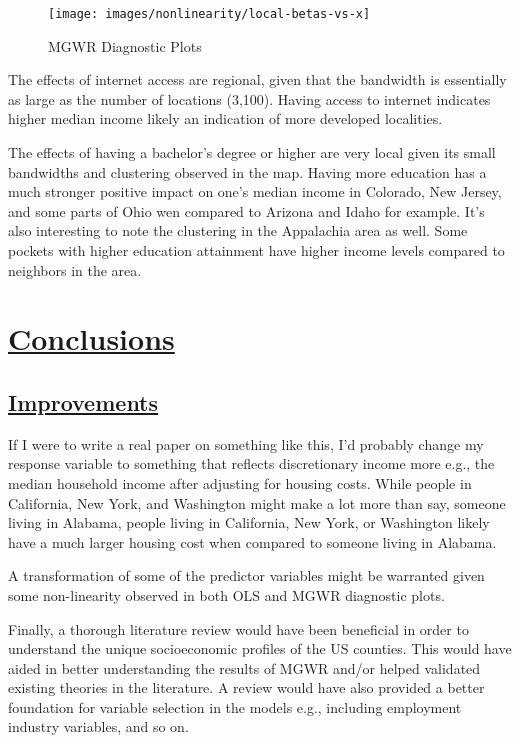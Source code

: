 \documentclass[
]{article}
\begin{document}
\begin{figure}[H]

{\centering \texttt{[image: images/nonlinearity/local-betas-vs-x]} 

}

\caption{MGWR Diagnostic Plots}\label{fig:unnamed-chunk-8}
\end{figure}

\newpage

The effects of internet access are regional, given that the bandwidth is
essentially as large as the number of locations (3,100). Having access
to internet indicates higher median income likely an indication of more
developed localities.

The effects of having a bachelor's degree or higher are very local given
its small bandwidths and clustering observed in the map. Having more
education has a much stronger positive impact on one's median income in
Colorado, New Jersey, and some parts of Ohio wen compared to Arizona and
Idaho for example. It's also interesting to note the clustering in the
Appalachia area as well. Some pockets with higher education attainment
have higher income levels compared to neighbors in the area.

\newpage

\section{\texorpdfstring{\ul{Conclusions}}{Conclusions}}\label{conclusions}

\subsection{\texorpdfstring{\ul{Improvements}}{Improvements}}\label{improvements}

If I were to write a real paper on something like this, I'd probably
change my response variable to something that reflects discretionary
income more e.g., the median household income after adjusting for
housing costs. While people in California, New York, and Washington
might make a lot more than say, someone living in Alabama, people living
in California, New York, or Washington likely have a much larger housing
cost when compared to someone living in Alabama.

A transformation of some of the predictor variables might be warranted
given some non-linearity observed in both OLS and MGWR diagnostic plots.

Finally, a thorough literature review would have been beneficial in
order to understand the unique socioeconomic profiles of the US
counties. This would have aided in better understanding the results of
MGWR and/or helped validated existing theories in the literature. A
review would have also provided a better foundation for variable
selection in the models e.g., including employment industry variables,
and so on.
\end{document}
